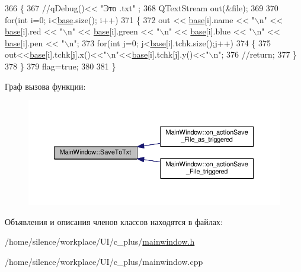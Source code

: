 \begin{DoxyCode}
366 \{
367     \textcolor{comment}{//qDebug()<< "Это .txt" ;}
368     QTextStream out(&file);
369 
370     \textcolor{keywordflow}{for}(\textcolor{keywordtype}{int} i=0; i<\hyperlink{class_main_window_a3413d4508f4981518b1b8ebf3b29121e}{base}.size(); i++)
371     \{
372         out << \hyperlink{class_main_window_a3413d4508f4981518b1b8ebf3b29121e}{base}[i].name << \textcolor{stringliteral}{"\(\backslash\)n"} << \hyperlink{class_main_window_a3413d4508f4981518b1b8ebf3b29121e}{base}[i].red << \textcolor{stringliteral}{"\(\backslash\)n"} << \hyperlink{class_main_window_a3413d4508f4981518b1b8ebf3b29121e}{base}[i].green << \textcolor{stringliteral}{"\(\backslash\)n"} << 
      \hyperlink{class_main_window_a3413d4508f4981518b1b8ebf3b29121e}{base}[i].blue << \textcolor{stringliteral}{"\(\backslash\)n"} << \hyperlink{class_main_window_a3413d4508f4981518b1b8ebf3b29121e}{base}[i].pen << \textcolor{stringliteral}{"\(\backslash\)n"};
373         \textcolor{keywordflow}{for}(\textcolor{keywordtype}{int} j=0; j<\hyperlink{class_main_window_a3413d4508f4981518b1b8ebf3b29121e}{base}[i].tchk.size();j++)
374             \{
375                 out<<\hyperlink{class_main_window_a3413d4508f4981518b1b8ebf3b29121e}{base}[i].tchk[j].x()<<\textcolor{stringliteral}{"\(\backslash\)n"}<<\hyperlink{class_main_window_a3413d4508f4981518b1b8ebf3b29121e}{base}[i].tchk[j].y()<<\textcolor{stringliteral}{"\(\backslash\)n"};
376                 \textcolor{comment}{//return;}
377             \}
378     \}
379     flag=\textcolor{keyword}{true};
380 
381 \}
\end{DoxyCode}


Граф вызова функции\+:\nopagebreak
\begin{figure}[H]
\begin{center}
\leavevmode
\includegraphics[width=350pt]{class_main_window_a64f7c1216a075bf75d3c2e7fb88fd371_icgraph}
\end{center}
\end{figure}




Объявления и описания членов классов находятся в файлах\+:\begin{DoxyCompactItemize}
\item 
/home/silence/workplace/\+U\+I/c\+\_\+plus/\hyperlink{mainwindow_8h}{mainwindow.\+h}\item 
/home/silence/workplace/\+U\+I/c\+\_\+plus/mainwindow.\+cpp\end{DoxyCompactItemize}
